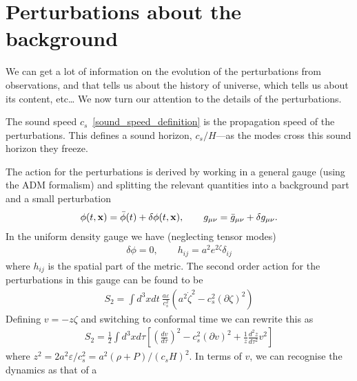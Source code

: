 \section{Perturbations about the background}
    We can get a lot of information on the evolution of the perturbations
    from observations, and that tells us about the history of universe,
    which tells us about its content, etc\ldots
    We now turn our attention to the details of the perturbations.


    The sound speed $c_s$~\eqref{sound_speed_definition} is
    the propagation speed of the perturbations.
    This defines a sound horizon, $c_s/H$---as the modes cross this sound
    horizon they freeze.


    The action for the perturbations is derived by working in a general gauge
    (using the ADM formalism) and splitting the relevant quantities into a background
    part and a small perturbation
    \begin{align}
        \phi(t,\mathbf{x})=\bar{\phi}(t)+\delta\phi(t,\mathbf{x}), \qquad g_{\mu\nu}=\bar{g}_{\mu\nu}+\delta g_{\mu\nu}.
    \end{align}
    In the uniform density gauge we have (neglecting tensor modes)
    \begin{align}
        \delta \phi=0, \qquad h_{ij}=a^2 e^{2\zeta} \delta_{ij}
    \end{align}
    where $h_{ij}$ is the spatial part of the metric.
    The second order action for the perturbations in this gauge can be found to be
    \begin{align}\label{zeta_action}
        S_{2} = \int d^3x dt~\frac{a\varepsilon}{c_s^2}\left(a^2\dot{\zeta}^2-c_s^2\left(\partial\zeta\right)^2\right)
    \end{align}
    Defining $v=-z\zeta$ and switching to conformal time we can rewrite this as
    \begin{align}\label{v_action}
        S_{2} = \frac{1}{2}\int d^3x d\tau \left[{\left(\frac{d v}{d \tau}\right)}^2-c_s^2\left(\partial v\right)^2+\frac{1}{z}\frac{d^2z}{d\tau^2}v^2\right]
    \end{align}
    where $z^2 = 2a^2\varepsilon/c_s^2 = a^2\left(\rho+P\right)/\left(c_sH\right)^2$.
    In terms of $v$, we can recognise the dynamics as that of a
